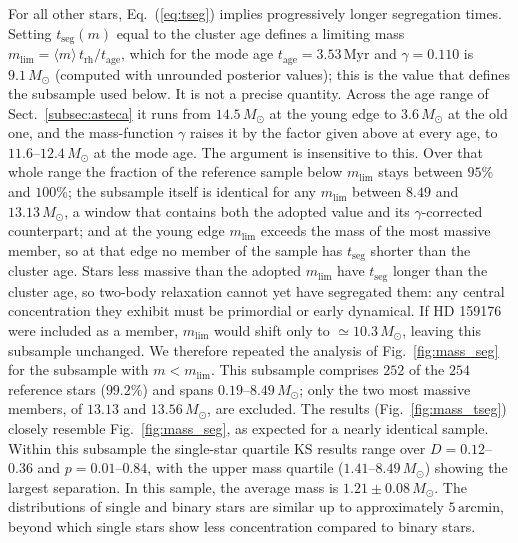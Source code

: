\documentclass{aa}
\begin{document}
For all other stars, Eq.~(\ref{eq:tseg}) implies progressively longer segregation times. Setting $t_{\mathrm{seg}}(m)$ equal to the cluster age defines a limiting mass $m_{\mathrm{lim}} = \langle m \rangle\, t_{\mathrm{rh}}/t_{\mathrm{age}}$, which for the mode age $t_{\mathrm{age}} = 3.53\,\mathrm{Myr}$ and $\gamma=0.110$ is $9.1\,M_\odot$ (computed with unrounded posterior values); this is the value that defines the subsample used below. It is not a precise quantity. Across the age range of Sect.~\ref{subsec:asteca} it runs from $14.5\,M_\odot$ at the young edge to $3.6\,M_\odot$ at the old one, and the mass-function $\gamma$ raises it by the factor given above at every age, to $11.6$--$12.4\,M_\odot$ at the mode age. The argument is insensitive to this. Over that whole range the fraction of the reference sample below $m_{\mathrm{lim}}$ stays between $95\%$ and $100\%$; the subsample itself is identical for any $m_{\mathrm{lim}}$ between $8.49$ and $13.13\,M_\odot$, a window that contains both the adopted value and its $\gamma$-corrected counterpart; and at the young edge $m_{\mathrm{lim}}$ exceeds the mass of the most massive member, so at that edge no member of the sample has $t_{\mathrm{seg}}$ shorter than the cluster age. Stars less massive than the adopted $m_{\mathrm{lim}}$ have $t_{\mathrm{seg}}$ longer than the cluster age, so two-body relaxation cannot yet have segregated them: any central concentration they exhibit must be primordial or early dynamical. If HD 159176 were included as a member, $m_{\mathrm{lim}}$ would shift only to $\simeq10.3\,M_\odot$, leaving this subsample unchanged. We therefore repeated the analysis of Fig.~\ref{fig:mass_seg} for the subsample with $m < m_{\mathrm{lim}}$. This subsample comprises $252$ of the $254$ reference stars ($99.2\%$) and spans $0.19$--$8.49\,M_\odot$; only the two most massive members, of $13.13$ and $13.56\,M_\odot$, are excluded. The results (Fig.~\ref{fig:mass_tseg}) closely resemble Fig.~\ref{fig:mass_seg}, as expected for a nearly identical sample. Within this subsample the single-star quartile KS results range over $D=0.12$--$0.36$ and $p=0.01$--$0.84$, with the upper mass quartile ($1.41$--$8.49\,M_\odot$) showing the largest separation. In this sample, the average mass is $1.21 \pm 0.08\,M_\odot$. The distributions of single and binary stars are similar up to approximately $5\,\mathrm{arcmin}$, beyond which single stars show less concentration compared to binary stars.
\end{document}
